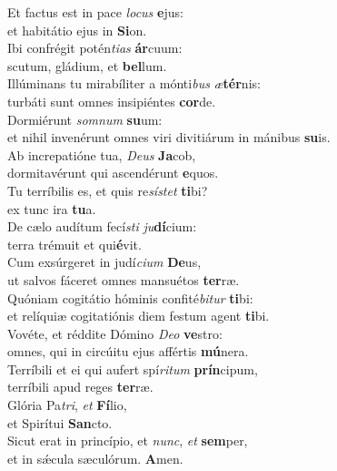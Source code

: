 \evenverse Et factus est in pace \textit{lo}\textit{cus} \textbf{e}jus:~\*\\
\evenverse et habitátio ejus in \textbf{Si}on.\\
\oddverse Ibi confrégit potén\textit{ti}\textit{as} \textbf{ár}cuum:~\*\\
\oddverse scutum, gládium, et \textbf{bel}lum.\\
\evenverse Illúminans tu mirabíliter a mónti\textit{bus} \textit{æ}\textbf{tér}nis:~\*\\
\evenverse turbáti sunt omnes insipiéntes \textbf{cor}de.\\
\oddverse Dormiérunt \textit{som}\textit{num} \textbf{su}um:~\*\\
\oddverse et nihil invenérunt omnes viri divitiárum in mánibus \textbf{su}is.\\
\evenverse Ab increpatióne tua, \textit{De}\textit{us} \textbf{Ja}cob,~\*\\
\evenverse dormitavérunt qui ascendérunt \textbf{e}quos.\\
\oddverse Tu terríbilis es, et quis re\textit{sí}\textit{stet} \textbf{ti}bi?~\*\\
\oddverse ex tunc ira \textbf{tu}a.\\
\evenverse De cælo audítum fecí\textit{sti} \textit{ju}\textbf{dí}cium:~\*\\
\evenverse terra trémuit et qui\textbf{é}vit.\\
\oddverse Cum exsúrgeret in judí\textit{ci}\textit{um} \textbf{De}us,~\*\\
\oddverse ut salvos fáceret omnes mansuétos \textbf{ter}ræ.\\
\evenverse Quóniam cogitátio hóminis confité\textit{bi}\textit{tur} \textbf{ti}bi:~\*\\
\evenverse et relíquiæ cogitatiónis diem festum agent \textbf{ti}bi.\\
\oddverse Vovéte, et réddite Dómino \textit{De}\textit{o} \textbf{ve}stro:~\*\\
\oddverse omnes, qui in circúitu ejus affértis \textbf{mú}nera.\\
\evenverse Terríbili et ei qui aufert spí\textit{ri}\textit{tum} \textbf{prín}cipum,~\*\\
\evenverse terríbili apud reges \textbf{ter}ræ.\\
\oddverse Glória Pa\textit{tri}, \textit{et} \textbf{Fí}lio,~\*\\
\oddverse et Spirítui \textbf{San}cto.\\
\evenverse Sicut erat in princípio, et \textit{nunc}, \textit{et} \textbf{sem}per,~\*\\
\evenverse et in sǽcula sæculórum. \textbf{A}men.\\
